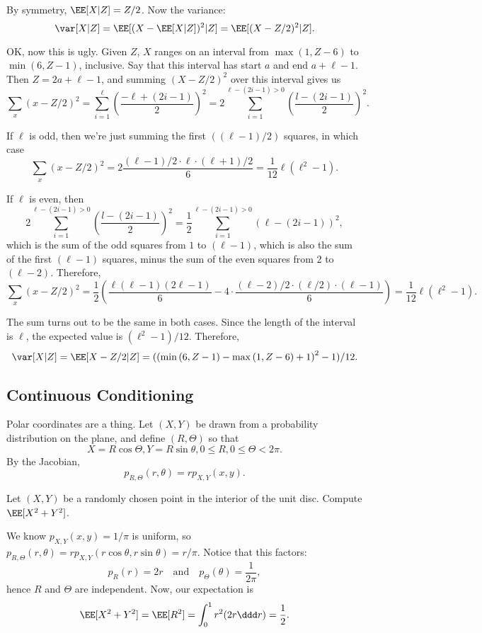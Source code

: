 By symmetry, $\EE[X|Z] = Z/2$. Now the variance: 
\[\var[X|Z] = \EE[(X-\EE[X|Z])^2|Z] = \EE[(X-Z/2)^2|Z].\]

OK, now this is ugly. Given $Z$, $X$ ranges on an interval from $\max{(1, Z-6)}$ to $\min{(6, Z-1)}$, inclusive. Say that this interval has start $a$ and end $a+\ell-1$. Then $Z = 2a+\ell-1$, and summing $(X-Z/2)^2$ over this interval gives us 
\[\sum_x (x-Z/2)^2 = \sum_{i=1}^{\ell}\left(\frac{-\ell + (2i-1)}{2}\right)^2 = 2\sum_{i=1}^{\ell-(2i-1) > 0}\left(\frac{l-(2i-1)}{2}\right)^2.\]

If $\ell$ is odd, then we're just summing the first $((\ell-1)/2)$ squares, in which case
\[\sum_x (x-Z/2)^2 = 2\frac{(\ell-1)/2\cdot \ell\cdot (\ell+1)/2}{6} = \frac{1}{12}\ell(\ell^2-1).\]

If $\ell$ is even, then
\[2\sum_{i=1}^{\ell-(2i-1) > 0}\left(\frac{l-(2i-1)}{2}\right)^2 = \frac{1}{2}\sum_{i=1}^{\ell-(2i-1) > 0}(\ell-(2i-1))^2,\]
which is the sum of the odd squares from $1$ to $(\ell-1)$, which is also the sum of the first $(\ell-1)$ squares, minus the sum of the even squares from $2$ to $(\ell-2)$. Therefore, 
\[\sum_x (x-Z/2)^2 = \frac{1}{2}\left(\frac{\ell(\ell-1)(2\ell-1)}{6} - 4\cdot \frac{(\ell-2)/2\cdot (\ell/2)\cdot (\ell-1)}{6}\right) = \frac{1}{12}\ell(\ell^2-1).\]

The sum turns out to be the same in both cases. Since the length of the interval is $\ell$, the expected value is $(\ell^2-1)/12$. Therefore, 
\[\var[X \vert Z] = \EE[X-Z/2 \vert Z] = (\left(\min{(6, Z-1)} - \max{(1, Z-6)} + 1\right)^2 - 1)/12.\]

\subsection{Continuous Conditioning}

Polar coordinates are a thing. Let $(X,Y)$ be drawn from a probability distribution on the plane, and define $(R, \Theta)$ so that 
\[X = R\cos{\Theta}, Y = R\sin{\theta}, 0\leq R, 0\leq \Theta < 2\pi.\]
By the Jacobian,
\[p_{R, \Theta}(r, \theta) = rp_{X,Y}(x,y).\]

\begin{example}
\exlabel

Let $(X,Y)$ be a randomly chosen point in the interior of the unit disc. Compute $\EE[X^2+Y^2]$. 
\end{example}

We know $p_{X,Y}(x,y) = 1/\pi$ is uniform, so $p_{R,\Theta}(r,\theta) = rp_{X,Y}(r\cos{\theta}, r\sin{\theta}) = r/\pi$. Notice that this factors: 
\[p_R(r) = 2r\quad \text{and} \quad p_{\Theta}(\theta) = \frac{1}{2\pi},\]
hence $R$ and $\Theta$ are independent. Now, our expectation is
\[\EE[X^2+Y^2] = \EE[R^2] = \int_0^1 r^2(2r\ddd r) = \frac{1}{2}.\]

